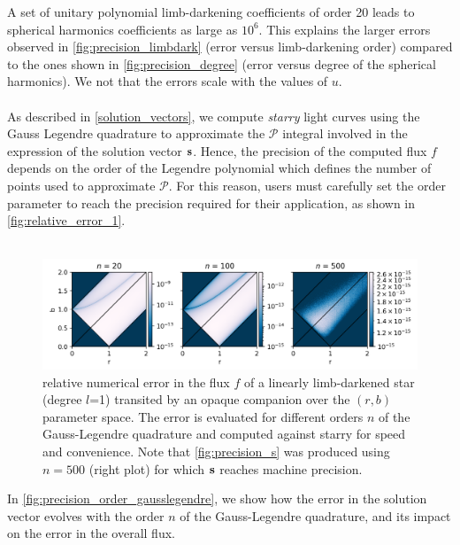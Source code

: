 \documentclass[modern]{aastex631}
\begin{document}
A set of unitary polynomial limb-darkening coefficients of order 20 leads to spherical harmonics coefficients as large as $10^6$. This explains the larger errors observed in \autoref{fig:precision_limbdark} (error versus limb-darkening order) compared to the ones shown in \autoref{fig:precision_degree} (error versus degree of the spherical harmonics). We not that the errors scale with the values of $u$.\\\\
As described in \autoref{solution_vectors}, we compute \textit{starry} light curves using the Gauss Legendre quadrature to approximate the $\mathcal{P}$ integral involved in the expression of the solution vector ${\mathbf{s}}$. Hence, the precision of the computed flux $f$ depends on the order of the Legendre polynomial which defines the number of points used to approximate $\mathcal{P}$. For this reason, users must carefully set the order parameter to reach the precision required for their application, as shown in \autoref{fig:relative_error_1}.\\\\
\begin{figure}[H]
    \begin{center}
        \includegraphics[width=\textwidth]{../workflows/precision/figures/br_error.png}
        \caption{relative numerical error in the flux $f$ of a linearly limb-darkened star (degree $l$=1) transited by an opaque companion over the $(r, b)$ parameter space. The error is evaluated for different orders $n$ of the Gauss-Legendre quadrature and computed against \textsf{starry} for speed and convenience. Note that \autoref{fig:precision_s} was produced using $n=500$ (right plot) for which ${\mathbf{s}}$ reaches machine precision. }
        \label{fig:relative_error_1}
    \end{center}
\end{figure}
In \autoref{fig:precision_order_gausslegendre}, we show how the error in the solution vector evolves with the order $n$ of the Gauss-Legendre quadrature, and its impact on the error in the overall flux.
\end{document}
